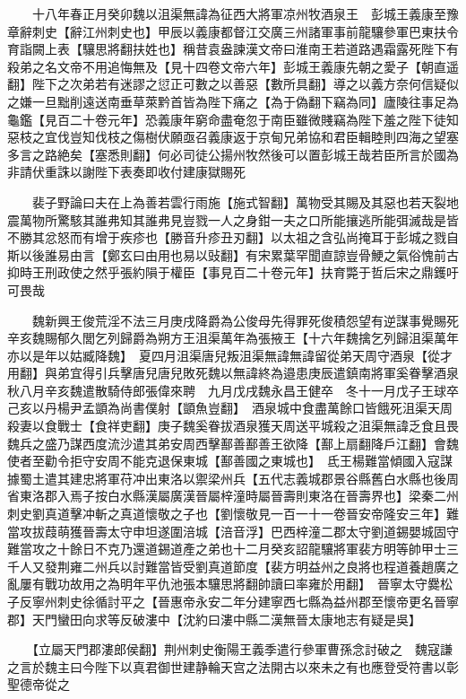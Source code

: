 　　十八年春正月癸卯魏以沮渠無諱為征西大將軍凉州牧酒泉王　彭城王義康至豫章辭刺史【辭江州刺史也】甲辰以義康都督江交廣三州諸軍事前龍驤參軍巴東扶令育詣闕上表【驤思將翻扶姓也】稱昔袁盎諫漢文帝曰淮南王若道路遇霜露死陛下有殺弟之名文帝不用追悔無及【見十四卷文帝六年】彭城王義康先朝之愛子【朝直遥翻】陛下之次弟若有迷謬之愆正可數之以善惡【數所具翻】導之以義方奈何信疑似之嫌一旦黜削遠送南垂草萊黔首皆為陛下痛之【為于偽翻下竊為同】廬陵往事足為龜鑑【見百二十卷元年】恐義康年窮命盡奄忽于南臣雖微賤竊為陛下羞之陛下徒知惡枝之宜伐豈知伐枝之傷樹伏願亟召義康返于京甸兄弟協和君臣輯睦則四海之望塞多言之路絶矣【塞悉則翻】何必司徒公揚州牧然後可以置彭城王哉若臣所言於國為非請伏重誅以謝陛下表奏即收付建康獄賜死

　　裴子野論曰夫在上為善若雲行雨施【施式智翻】萬物受其賜及其惡也若天裂地震萬物所驚駭其誰弗知其誰弗見豈戮一人之身鉗一夫之口所能攘逃所能弭滅哉是皆不勝其忿怒而有增于疾疹也【勝音升疹丑刃翻】以太祖之含弘尚掩耳于彭城之戮自斯以後誰易由言【鄭玄曰由用也易以䜴翻】有宋累葉罕聞直諒豈骨鯁之氣俗愧前古抑時王刑政使之然乎張約隕于權臣【事見百二十卷元年】扶育斃于哲后宋之鼎鑊吁可畏哉

　　魏新興王俊荒淫不法三月庚戌降爵為公俊母先得罪死俊積怨望有逆謀事覺賜死　辛亥魏賜郁久閭乞列歸爵為朔方王沮渠萬年為張掖王【十六年魏擒乞列歸沮渠萬年亦以是年以姑臧降魏】　夏四月沮渠唐兒叛沮渠無諱無諱留從弟天周守酒泉【從才用翻】與弟宜得引兵擊唐兒唐兒敗死魏以無諱終為邉患庚辰遣鎮南將軍奚眷擊酒泉　秋八月辛亥魏遣散騎侍郎張偉來聘　九月戊戌魏永昌王健卒　冬十一月戊子王球卒己亥以丹楊尹孟顗為尚書僕射【顗魚豈翻】　酒泉城中食盡萬餘口皆餓死沮渠天周殺妻以食戰士【食祥吏翻】庚子魏奚眷拔酒泉獲天周送平城殺之沮渠無諱乏食且畏魏兵之盛乃謀西度流沙遣其弟安周西擊鄯善鄯善王欲降【鄯上扇翻降戶江翻】會魏使者至勸令拒守安周不能克退保東城【鄯善國之東城也】　氐王楊難當傾國入寇謀據蜀土遣其建忠將軍苻冲出東洛以禦梁州兵【五代志義城郡景谷縣舊白水縣也後周省東洛郡入焉子按白水縣漢屬廣漢晉屬梓潼時屬晉壽則東洛在晉壽界也】梁秦二州刺史劉真道擊冲斬之真道懷敬之子也【劉懷敬見一百一十一卷晉安帝隆安三年】難當攻拔葭萌獲晉壽太守申坦遂圍涪城【涪音浮】巴西梓潼二郡太守劉道錫嬰城固守難當攻之十餘日不克乃還道錫道產之弟也十二月癸亥詔龍驤將軍裴方明等帥甲士三千人又發荆雍二州兵以討難當皆受劉真道節度【裴方明益州之良將也程道養趙廣之亂屢有戰功故用之為明年平仇池張本驤思將翻帥讀曰率雍於用翻】　晉寧太守爨松子反寧州刺史徐循討平之【晉惠帝永安二年分建寧西七縣為益州郡至懷帝更名晉寧郡】天門蠻田向求等反破漊中【沈約曰漊中縣二漢無晉太康地志有疑是吳】

　　【立屬天門郡漊郎侯翻】荆州刺史衡陽王義季遣行參軍曹孫念討破之　魏寇謙之言於魏主曰今陛下以真君御世建静輪天宫之法開古以來未之有也應登受符書以彰聖德帝從之

